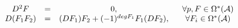 \begin{equation}\label{BASE}
\begin{array}{cccc}
D^2F & = & 0, & ~~\forall p, F \in \Omega^*({\cal A})\\
D(F_1 F_2) & = & (DF_1) F_2 + (-1)^{degF_1} F_1 (DF_2),& ~~\forall
F_i \in \Omega^*({\cal A})
\end{array}
\end{equation}

